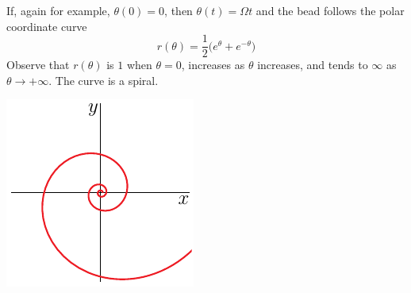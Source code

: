 \begin{eg}
\begin{equation*}
\end{equation*}
If, again for example, $\theta(0) = 0$, then $\theta(t) = \Omega t$
and the bead follows the polar coordinate curve
\begin{equation*}
r(\theta) = \frac{1}{2}\big(e^{\theta}+e^{-\theta}\big)
\end{equation*}
Observe that $r(\theta)$ is $1$ when $\theta=0$, increases as $\theta$ increases, and tends to $\infty$ as $\theta\rightarrow+\infty$. The curve is a spiral.
\begin{efig}
\begin{center}
    \includegraphics{beadCurve.pdf}
\end{center}
\end{efig}
\end{eg}

